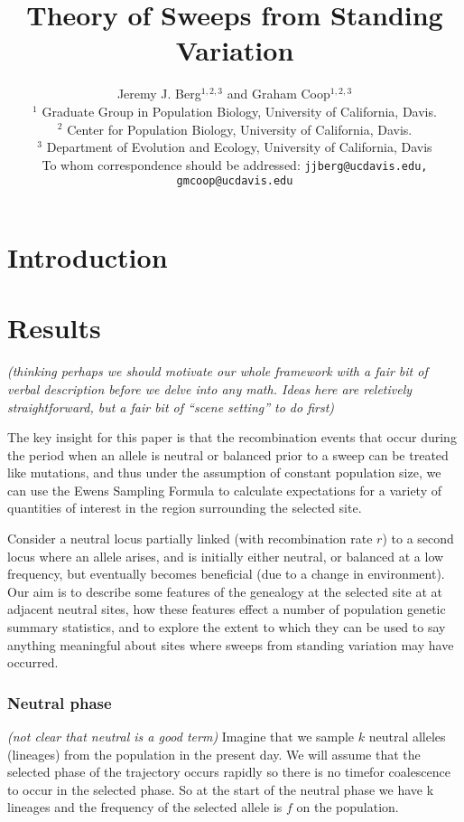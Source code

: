 \documentclass[a4paper,10pt]{article}
\title{Theory of Sweeps from Standing Variation}
\author{
Jeremy J. Berg$^{1,2,3}$ and Graham Coop$^{1,2,3}$ \\
$^1$ Graduate Group in Population Biology, University of California, Davis. \\
$^2$ Center for Population Biology, University of California, Davis.\\
$^3$ Department of Evolution and Ecology, University of California, Davis\\
\small To whom correspondence should be addressed: \texttt{jjberg@ucdavis.edu, gmcoop@ucdavis.edu}\\
}
\date{}
\newcommand{\gc}[1]{{\it \color{red} (#1)} }
\newcommand{\jb}[1]{{\it\color{blue} (#1)} }
\begin{document}
\maketitle

\begin{abstract}
\end{abstract}

\section{Introduction}



\section{Results}
\jb{thinking perhaps we should motivate our whole framework with a fair bit of verbal description before we delve into any math. Ideas here are reletively straightforward, but a fair bit of ``scene setting'' to do first}

The key insight for this paper is that the recombination events that occur during the period when an allele is neutral or balanced prior to a sweep can be treated like mutations, and thus under the assumption of constant population size, we can use the Ewens Sampling Formula to calculate expectations for a variety of quantities of interest in the region surrounding the selected site.

Consider a neutral locus partially linked (with recombination rate $r$) to a second locus where an allele arises, and is initially either neutral, or balanced at a low frequency, but eventually becomes beneficial (due to a change in environment). Our aim is to describe some features of the genealogy at the selected site at at adjacent neutral sites, how these features effect a number of population genetic summary statistics, and to explore the extent to which they can be used to say anything meaningful about sites where sweeps from standing variation may have occurred. 

\subsubsection{Neutral phase} \gc{not clear that neutral is a good term}
Imagine that we sample $k$ neutral alleles (lineages) from the population in the present day. 
We will assume that the selected phase of the trajectory occurs rapidly so there is no timefor coalescence to occur in the selected phase. So at the start of the neutral phase we have k lineages and the frequency of the selected allele is $f$ on the population.
\end{document}
